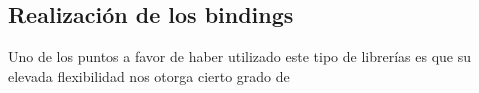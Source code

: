 \subsection{Realización de los bindings}
Uno de los puntos a favor de haber utilizado este tipo de librerías es que su elevada flexibilidad
nos otorga cierto grado de 
